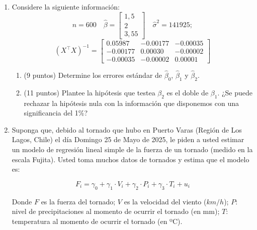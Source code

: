 \documentclass{article} %
\begin{document}
{\begin{enumerate}
\begin{enumerate}
    Utilizando información de este modelo y del modelo original que incluía las variables \textit{motheduc} y \textit{fatheduc}, realice una prueba de significancia conjunta (prueba F) para evaluar si ambas variables pueden ser excluidas del modelo sin pérdida significativa de capacidad explicativa. ¿Debe la investigación preferir el modelo completo o el modelo reducido? Justifique su elección en función de criterios estadísticos y del objetivo del análisis.

\end{enumerate}

  \item Considere la siguiente información:
 \[
n=600 \quad \hat{\beta} =  \begin{bmatrix}
1,5 \\
2 \\
3,55 
\end{bmatrix} \quad \hat{\sigma}^2 = 141925;\]
\[(X^\top X)^{-1} = 
\begin{bmatrix}
0.05987 & -0.00177 & -0.00035 \\
-0.00177 & 0.00030 & -0.00002 \\
-0.00035 & -0.00002 & 0.00001
\end{bmatrix}
\]

\begin{enumerate}
    \item (9 puntos) Determine los errores estándar de $\hat{\beta}_0$, $\hat{\beta}_1$ y $\hat{\beta}_2$.
\item(11 puntos) Plantee la hip\'otesis  que testea $\beta_2$ es el doble de  $\beta_1$. 
¿Se puede rechazar la hipótesis nula con la información que disponemos con una significancia del 1\%?
    \end{enumerate}
      \item     Suponga que, debido al tornado que hubo en Puerto Varas (Región de Los Lagos, Chile) el día Domingo 25 de Mayo de 2025, le piden a usted estimar un modelo de regresión lineal simple de la fuerza de un tornado (medido en la escala Fujita). Usted toma muchos datos de tornados y estima que el modelo es:

    $$F_i = \gamma_0 + \gamma_1 \cdot V_i + \gamma_2 \cdot P_i + \gamma_3 \cdot T_i + u_i$$

    Donde $F$ es la fuerza del tornado; $V$ es la velocidad del viento ($km/h$); $P$: nivel de precipitaciones al momento de ocurrir el tornado (en mm); $T$: temperatura al momento de ocurrir el tornado (en ºC).\\


\end{enumerate}}
\end{document}
